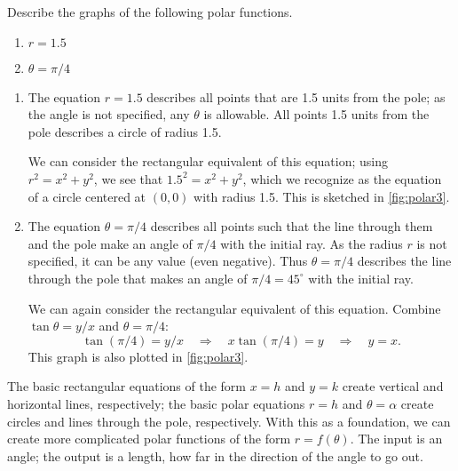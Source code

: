 \begin{example}\label{ex_polar3}%
Describe the graphs of the following polar functions.
\begin{enumerate}
	\item $r = 1.5$
	\item $\theta = \pi/4 $
\end{enumerate}
%
\solution
\begin{enumerate}
\item		The equation $r=1.5$ describes all points that are 1.5 units from the pole; as the angle is not specified, any $\theta$ is allowable. All points 1.5 units from the pole describes a circle of radius 1.5.

We can consider the rectangular equivalent of this equation; using $r^2=x^2+y^2$, we see that $1.5^2=x^2+y^2$, which we recognize as the equation of a circle centered at $(0,0)$ with radius 1.5. This is sketched in \autoref{fig:polar3}.


\item		The equation $\theta = \pi/4$ describes all points such that the line through them and the pole make an angle of $\pi/4$ with the initial ray. As the radius $r$ is not specified, it can be any value (even negative). Thus $\theta = \pi/4$ describes the line through the pole that makes an angle of $\pi/4 = 45^\circ$ with the initial ray.

We can again consider the rectangular equivalent of this equation. Combine $\tan \theta =y/x$ and $\theta =\pi/4$:
\[\tan(\pi/4) = y/x \quad \Rightarrow \quad x\tan(\pi/4) = y \quad \Rightarrow \quad y = x.\] 
This graph is also plotted in \autoref{fig:polar3}.
\end{enumerate}
\end{example}

The basic rectangular equations of the form $x=h$ and $y=k$ create vertical and horizontal lines, respectively; the basic polar equations $r= h$ and $\theta =\alpha$ create circles and lines through the pole, respectively. With this as a foundation, we can create more complicated polar functions of the form $r=f(\theta)$. The input is an angle; the output is a length, how far in the direction of the angle to go out.

